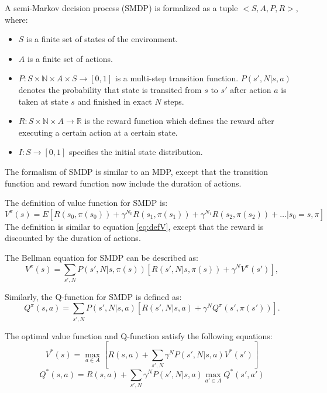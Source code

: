 \begin{definition} A semi-Markov decision process (SMDP) is formalized as a tuple $<S, A, P, R>$, where:
\begin{itemize}
    \item $S$ is a finite set of states of the environment.
    \item $A$ is a finite set of actions.
    \item $P:S \times \mathbb{N} \times A \times S \rightarrow [0, 1]$ is a
        multi-step transition function. $P(s', N | s, a)$ denotes the
        probability that state is transited from  $s$ to $s'$ after action $a$
        is taken at state $s$ and finished in exact $N$ steps.
    \item $R:S \times \mathbb{N} \times A \rightarrow \mathbb{R}$ is the reward function which defines the reward after executing a certain action at a certain state.
    \item $I:S \rightarrow [0, 1]$ specifies the initial state distribution.
 \end{itemize}
\end{definition}

The formalism of SMDP is similar to an MDP, except that the transition function and reward function
now include the duration of actions. 

The definition of value function for SMDP is:
\begin{equation}
    V^{\pi}(s) = E[R(s_0, \pi(s_0)) + \gamma^{N_0} R(s_1, \pi(s_1)) + \gamma^{N_1} R(s_2, \pi(s_2)) + \dots | s_0 = s, \pi]
\end{equation}
The definition is similar to equation \ref{eq:defV}, except that the reward is discounted by
the duration of actions.

The Bellman equation for SMDP can be described as:
\begin{equation}
    V^{\pi}(s) = \sum_{s', N}P(s', N|s, \pi(s))[R(s', N|s, \pi(s)) + \gamma^N V^{\pi}(s')],
    \label{eq:SMDPV}
\end{equation}

Similarly, the Q-function for SMDP is defined as:
\begin{equation}
    Q^{\pi}(s, a) = \sum_{s', N}P(s', N|s, a)[R(s', N|s, a) + \gamma^N Q^{\pi}(s', \pi(s'))].
    \label{eq:SMDPQ}
\end{equation}

The optimal value function and Q-function satisfy the following equations:
\begin{equation}
    V^*(s) = \max_{a \in A} [R(s, a) + \sum_{s', N} \gamma^N P(s', N|s, a)V^*(s')]
\end{equation}
\begin{equation}
    Q^*(s, a) = R(s, a) + \sum_{s', N} \gamma^N P(s', N|s, a) \max_{a' \in A} Q^*(s', a')
\end{equation}

